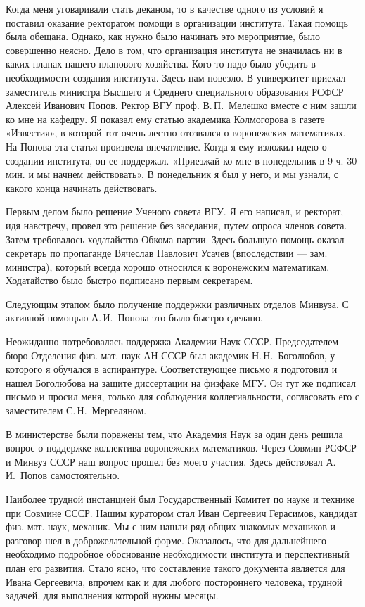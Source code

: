 Когда меня уговаривали стать деканом, то в качестве одного из условий я
поставил оказание ректоратом помощи в организации института. Такая помощь была обещана. Однако, как нужно было начинать это мероприятие, было совершенно неясно. Дело в том, что организация института не значилась ни в каких планах нашего планового хозяйства. Кого-то надо было убедить в необходимости создания института. Здесь нам повезло. В университет приехал заместитель министра Высшего и Среднего специального образования РСФСР Алексей Иванович Попов. Ректор ВГУ проф. В.\,П.~Мелешко вместе с ним зашли ко мне на кафедру. Я показал ему статью академика Колмогорова в газете «Известия», в которой тот очень лестно отозвался о воронежских математиках. На Попова эта статья произвела впечатление. Когда я ему изложил идею о создании института, он ее поддержал. «Приезжай ко мне в понедельник в 9 ч. 30 мин. и мы начнем действовать». В понедельник я был у него, и мы узнали, с какого конца начинать действовать.

Первым делом было решение Ученого совета ВГУ. Я его написал, и ректорат, идя навстречу, провел это решение без заседания, путем опроса членов совета. Затем требовалось ходатайство Обкома партии. Здесь большую помощь оказал секретарь по пропаганде Вячеслав Павлович Усачев (впоследствии --- зам. министра), который всегда хорошо относился к воронежским математикам. Ходатайство было быстро подписано первым секретарем.

Следующим этапом было получение поддержки различных отделов Минвуза. С активной помощью А.\,И.~Попова это было быстро сделано.

Неожиданно потребовалась поддержка Академии Наук СССР. Председателем бюро Отделения физ. мат. наук АН СССР был академик Н.\,Н.~Боголюбов, у которого я обучался в аспирантуре. Соответствующее письмо я подготовил и нашел Боголюбова на защите диссертации на физфаке МГУ. Он тут же подписал письмо и просил меня, только для соблюдения коллегиальности, согласовать его с заместителем С.\,Н.~Мергеляном.

В министерстве были поражены тем, что Академия Наук за один день решила вопрос о поддержке коллектива воронежских математиков. Через Совмин РСФСР и Минвуз СССР наш вопрос прошел без моего участия. Здесь действовал А.\,И.~Попов самостоятельно.

Наиболее трудной инстанцией был Государственный Комитет по науке и технике при Совмине СССР.
Нашим куратором стал Иван Сергеевич Герасимов, кандидат физ.-мат. наук, механик. Мы с ним нашли ряд общих знакомых механиков и разговор шел в доброжелательной форме. Оказалось, что для дальнейшего необходимо подробное обоснование необходимости института и перспективный план его развития. Стало ясно, что составление такого документа является для Ивана Сергеевича, впрочем как и для любого постороннего человека, трудной задачей, для выполнения которой нужны месяцы.

